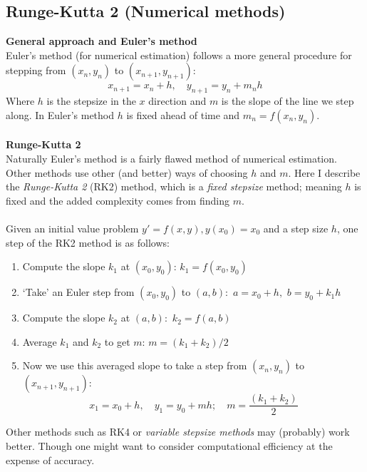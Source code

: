 \documentclass{report}
\begin{document}
\subsection{Runge-Kutta 2 (Numerical methods)}%
\textbf{General approach and Euler's method}\\
Euler's method (for numerical estimation) follows a more general procedure for stepping from 
$(x_n,y_n)$ to $(x_{n+1},y_{n+1})$:
\begin{equation*}
x_{n+1}=x_n+h,\quad y_{n+1}=y_n+m_nh
\end{equation*}
Where $h$ is the stepsize in the $x$ direction and $m$ is the slope of the line we step along. In Euler's
method $h$ is fixed ahead of time and $m_n=f(x_n,y_n)$.\\
\vspace{1mm}\\
\textbf{Runge-Kutta 2}\\
Naturally Euler's method is a fairly flawed method of numerical estimation. Other methods use other (and better)
ways of choosing $h$ and $m$. Here I describe the \textit{Runge-Kutta 2} (RK2) method, which is a
\textit{fixed stepsize} method; meaning $h$ is fixed and the added complexity comes from finding $m$.\\
\vspace{1mm}\\
Given an initial value problem $y'=f(x,y),y(x_0)=x_0$ and a step size $h$, one step of the RK2 method is as follows:
\begin{enumerate}
\item Compute the slope $k_1$ at $(x_0,y_0)$: $k_1=f(x_0,y_0)$
\item `Take' an Euler step from $(x_0,y_0)$ to $(a,b):$ $a=x_0+h,$  $b=y_0+k_1h$
\item Compute the slope $k_2$ at $(a,b):$ $k_2=f(a,b)$
\item Average $k_1$ and $k_2$ to get $m$: $m=(k_1+k_2)/2$
\item Now we use this averaged slope to take a step from 
$(x_n,y_n)$ to $(x_{n+1},y_{n+1})$: 
\begin{equation*}
x_{1}=x_0+h,\quad y_{1}=y_0+mh;\quad m=\frac{(k_1+k_2)}{2}
\end{equation*}
\end{enumerate}
Other methods such as RK4 or \textit{variable stepsize methods} may (probably) work better. Though one might want
to consider computational efficiency at the expense of accuracy.
\newpage
\end{document}
